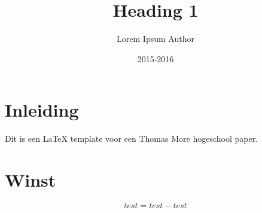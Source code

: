 \documentclass[11pt, a4paper, oneside]{book}
\title{Heading 1}
\date{2015-2016}
\author{Lorem Ipsum Author}
\begin{document}
	\begin{titlepage}
	\end{titlepage}

\tableofcontents

\newpage




\chapter{Inleiding}

Dit is een LaTeX template voor een Thomas More hogeschool paper.

\newpage

\chapter{Winst}

	\begin{mdframed}[backgroundcolor=grijs!40,shadow=false,roundcorner=8pt]
		$$test = test - test$$
	\end{mdframed}
\end{document}

